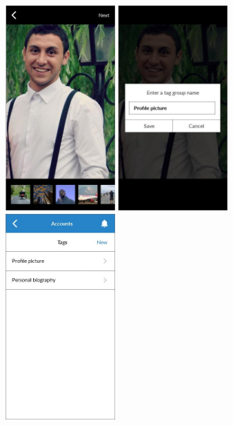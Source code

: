 \begin{figure}
  \subfigures
  \centering
  \begin{minipage}{4.6cm}
    \centering
    \includegraphics[width=4.2cm]{inc/ui_itag_step4.jpg}
    \caption{}
    \label{fig:ui_itag_step4}
  \end{minipage}
  \begin{minipage}{4.6cm}
    \centering
    \includegraphics[width=4.2cm]{inc/ui_itag_step5.jpg}
    \caption{}
    \label{fig:ui_itag_step5}
  \end{minipage}
  \begin{minipage}{4.6cm}
    \centering
    \includegraphics[width=4.2cm]{inc/ui_itag_step6.jpg}
    \caption{}
    \label{fig:ui_itag_step6}
  \end{minipage}
\end{figure}

